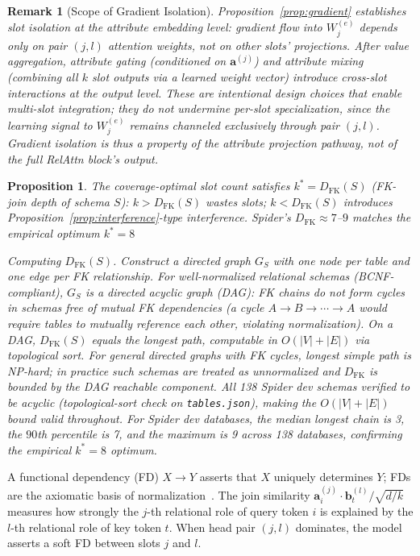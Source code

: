 \documentclass[conference]{IEEEtran}
\newtheorem{proposition}[theorem]{Proposition}
\newtheorem{remark}[theorem]{Remark}
\begin{document}
\begin{remark}[Scope of Gradient Isolation]
\label{rem:gradient_scope}
Proposition~\ref{prop:gradient} establishes slot isolation at the \emph{attribute embedding} level: gradient flow into $W_j^{(e)}$ depends only on pair $(j,l)$ attention weights, not on other slots' projections. After value aggregation, attribute gating (conditioned on $\mathbf{a}^{(j)}$) and attribute mixing (combining all $k$ slot outputs via a learned weight vector) introduce cross-slot interactions at the \emph{output} level. These are intentional design choices that enable multi-slot integration; they do not undermine per-slot specialization, since the learning signal to $W_j^{(e)}$ remains channeled exclusively through pair $(j,l)$. Gradient isolation is thus a property of the attribute \emph{projection} pathway, not of the full RelAttn block's output.
\end{remark}

\begin{proposition}
\label{prop:fkdepth}
The coverage-optimal slot count satisfies $k^* = D_{\mathrm{FK}}(S)$ (FK-join depth of schema $S$): $k > D_{\mathrm{FK}}(S)$ wastes slots; $k < D_{\mathrm{FK}}(S)$ introduces Proposition~\ref{prop:interference}-type interference. Spider's $D_{\mathrm{FK}} \approx 7$--$9$ matches the empirical optimum $k^*{=}8$ 

\smallskip\noindent\textit{Computing $D_{\mathrm{FK}}(S)$.} Construct a directed graph $G_S$ with one node per table and one edge per FK relationship. For well-normalized relational schemas (BCNF-compliant), $G_S$ is a directed acyclic graph (DAG): FK chains do not form cycles in schemas free of mutual FK dependencies (a cycle $A \to B \to \cdots \to A$ would require tables to mutually reference each other, violating normalization). On a DAG, $D_{\mathrm{FK}}(S)$ equals the longest path, computable in $O(|V|+|E|)$ via topological sort. For general directed graphs with FK cycles, longest simple path is NP-hard; in practice such schemas are treated as unnormalized and $D_{\mathrm{FK}}$ is bounded by the DAG reachable component. All 138 Spider dev schemas verified to be acyclic (topological-sort check on \texttt{tables.json}), making the $O(|V|+|E|)$ bound valid throughout. For Spider dev databases, the median longest chain is 3, the $90$th percentile is 7, and the maximum is 9 across 138 databases, confirming the empirical $k^*{=}8$ optimum.
\end{proposition}

A functional dependency (FD) $X \to Y$ asserts that $X$ uniquely determines $Y$; FDs are the axiomatic basis of normalization~\cite{codd1970relational}. The join similarity $\mathbf{a}^{(j)}_i \cdot \mathbf{b}^{(l)}_t / \sqrt{d/k}$ measures how strongly the $j$-th relational role of query token $i$ is explained by the $l$-th relational role of key token $t$. When head pair $(j,l)$ dominates, the model asserts a soft FD between slots $j$ and $l$.
\end{document}
